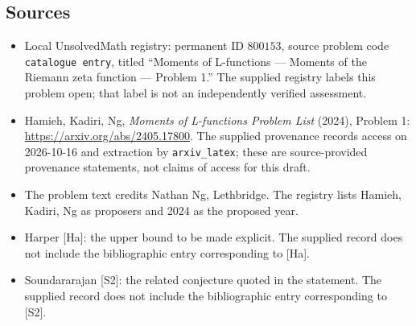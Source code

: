 \documentclass[11pt]{article}
\begin{document}
\subsection{Sources}
\begin{itemize}
\item Local UnsolvedMath registry: permanent ID \(800153\), source problem code \texttt{catalogue entry}, titled ``Moments of L-functions --- Moments of the Riemann zeta function --- Problem 1.'' The supplied registry labels this problem open; that label is not an independently verified assessment.
\item Hamieh, Kadiri, Ng, \emph{Moments of L-functions Problem List} (2024), Problem 1: \url{https://arxiv.org/abs/2405.17800}. The supplied provenance records access on 2026-10-16 and extraction by \texttt{arxiv\_latex}; these are source-provided provenance statements, not claims of access for this draft.
\item The problem text credits Nathan Ng, Lethbridge. The registry lists Hamieh, Kadiri, Ng as proposers and 2024 as the proposed year.
\item Harper [Ha]: the upper bound to be made explicit. The supplied record does not include the bibliographic entry corresponding to [Ha].
\item Soundararajan [S2]: the related conjecture quoted in the statement. The supplied record does not include the bibliographic entry corresponding to [S2].
\end{itemize}
\end{document}
